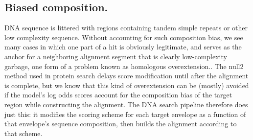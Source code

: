 \subsection{Biased composition.}

DNA sequence is littered with regions containing tandem simple repeats
or other low complexity sequence. Without accounting for such
composition bias, we see many cases in which one part of a hit is
obviously legitimate, and serves as the anchor for a neighboring
alignment segment that is clearly low-complexity garbage, one form of
a problem known as homologous overextension.\cite{Gonzalez10}. The
null2 method used in protein search delays score modification until
after the alignment is complete, but we know that this kind of
overextension can be (mostly) avoided if the model's log odds scores
account for the composition bias of the target region while
constructing the alignment. The DNA search pipeline therefore does
just this: it modifies the scoring scheme for each target envelope as
a function of that envelope's sequence composition, then builds the
alignment according to that scheme.





